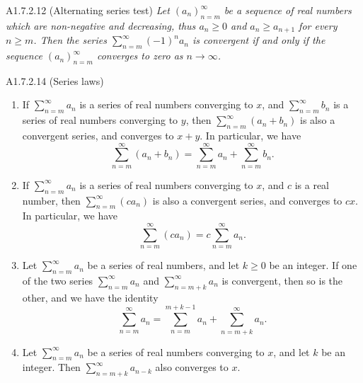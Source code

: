 \begin{proposition}{A1.7.2.12}
    (Alternating series test) \emph{Let $(a_n)_{n=m}^{\infty}$ be a sequence of real
    numbers which are non-negative and decreasing, thus $a_n \geq 0$ and $a_{n} \geq a_{n+1}$
    for every $n \geq m$. Then the series $\sum_{n=m}^{\infty} (-1)^n a_n$ is convergent
    if and only if the sequence $(a_n)_{n=m}^{\infty}$ converges to zero as $n \rightarrow \infty$.}
\end{proposition}

\begin{proposition}{A1.7.2.14}
    (Series laws)
    \begin{enumerate}
        \item If $\sum_{n=m}^{\infty} a_n$ is a series of real numbers converging
        to $x$, and $\sum_{n=m}^{\infty} b_n$ is a series of real numbers converging
        to $y$, then $\sum_{n=m}^{\infty} (a_n + b_n)$ is also a convergent series,
        and converges to $x + y$. In particular, we have
        \begin{equation*}
            \sum_{n=m}^{\infty} (a_n + b_n) = \sum_{n=m}^{\infty} a_n + \sum_{n=m}^{\infty} b_n.
        \end{equation*}
        \item If $\sum_{n=m}^{\infty} a_n$ is a series of real numbers converging
        to $x$, and $c$ is a real number, then $\sum_{n=m}^{\infty} (ca_n)$ is also
        a convergent series, and converges to $cx$. In particular, we have
        \begin{equation*}
            \sum_{n=m}^{\infty} (ca_n) = c \sum_{n=m}^{\infty} a_n.
        \end{equation*}
        \item Let $\sum_{n=m}^{\infty} a_n$ be a series of real numbers, and let
        $k \geq 0$ be an integer. If one of the two series $\sum_{n=m}^{\infty} a_n$
        and $\sum_{n=m+k}^{\infty} a_n$ is convergent, then so is the other, and
        we have the identity
        \begin{equation*}
            \sum_{n=m}^{\infty} a_n = \sum_{n=m}^{m+k-1} a_n + \sum_{n=m+k}^{\infty} a_n.
        \end{equation*}
        \item Let $\sum_{n=m}^{\infty} a_n$ be a series of real numbers converging
        to $x$, and let $k$ be an integer. Then $\sum_{n=m+k}^{\infty} a_{n-k}$
        also converges to $x$.
    \end{enumerate}
\end{proposition}

